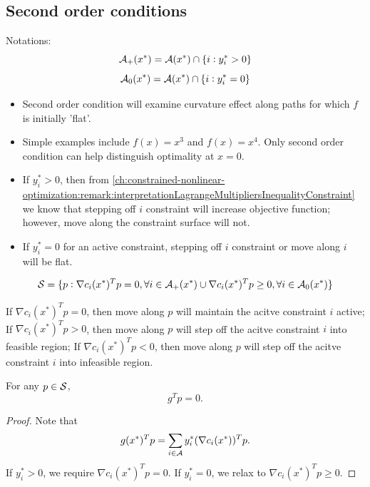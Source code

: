 \begin{refsection}
\subsection{Second order conditions}
\begin{mdframed}
Notations:\\
$$\mathcal{A}_+(x^*) = \mathcal{A}(x^*) \cap \{i:y_i^* > 0\}$$
$$\mathcal{A}_0(x^*) = \mathcal{A}(x^*) \cap \{i:y_i^* = 0\}$$
\end{mdframed}

\begin{remark}\hfill
\begin{itemize}
	\item Second order condition will examine curvature effect along paths for which $f$ is initially 'flat'.
	\item Simple examples include $f(x) = x^3$ and $f(x) = x^4$. Only second order condition can help distinguish optimality at $x = 0$.
	\item If $y_i^* > 0$, then from  \autoref{ch:constrained-nonlinear-optimization:remark:interpretationLagrangeMultipliersInequalityConstraint} we know that stepping off $i$ constraint will increase objective function; however, move along the constraint surface will not.
	\item If $y_i^* = 0$ for an active constraint, stepping off $i$ constraint or move along $i$ will be flat.   
\end{itemize}
\end{remark}

\begin{definition}
		$$\mathcal{S}=\{p:\nabla c_i(x^*)^Tp = 0, \forall i\in \mathcal{A}_+(x^*) \cup \nabla c_i(x^*)^Tp \geq 0, \forall i\in \mathcal{A}_0(x^*)\}$$ 
\end{definition}

\begin{remark}
If $\nabla c_i(x^*)^Tp = 0$, then move along $p$ will maintain the acitve constraint $i$ active; If $\nabla c_i(x^*)^Tp > 0$, then move along $p$ will step off the acitve constraint $i$ into feasible region; If $\nabla c_i(x^*)^Tp < 0$, then move along $p$ will step off the acitve constraint $i$ into infeasible region. 
\end{remark}

\begin{lemma}
For any $p\in \mathcal{S}$, 
$$g^T p = 0.$$
\end{lemma}
\begin{proof}
Note that
		$$g(x^*)^Tp = \sum_{i\in \mathcal{A}} y_i^* (\nabla c_i(x^*))^Tp.$$
If $y_i^* > 0$, we require $\nabla c_i(x^*)^T p = 0.$ If $y_i^* = 0$, we relax to $\nabla c_i(x^*)^T p \geq 0.$
\end{proof}



\end{refsection}
